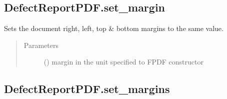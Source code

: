 \documentclass[letterpaper,10pt,english]{sphinxmanual}
\begin{document}
\begin{fulllineitems}
\begin{fulllineitems}
\begin{quote}
\begin{description}
\end{description}\end{quote}

\end{fulllineitems}



\subsection{DefectReportPDF.set\_margin}
\label{\detokenize{generated/quality_assessment.quality_pdf_report.DefectReportPDF.set_margin:defectreportpdf-set-margin}}\label{\detokenize{generated/quality_assessment.quality_pdf_report.DefectReportPDF.set_margin::doc}}

\begin{fulllineitems}
\label{\detokenize{generated/quality_assessment.quality_pdf_report.DefectReportPDF.set_margin:quality_assessment.quality_pdf_report.DefectReportPDF.set_margin}}
\sphinxAtStartPar
Sets the document right, left, top \& bottom margins to the same value.
\begin{quote}\begin{description}
\item[{Parameters}] \leavevmode
\sphinxAtStartPar
{} () \textendash{} margin in the unit specified to FPDF constructor

\end{description}\end{quote}

\end{fulllineitems}



\subsection{DefectReportPDF.set\_margins}
\label{\detokenize{generated/quality_assessment.quality_pdf_report.DefectReportPDF.set_margins:defectreportpdf-set-margins}}\label{\detokenize{generated/quality_assessment.quality_pdf_report.DefectReportPDF.set_margins::doc}}


\end{fulllineitems}
\end{document}
